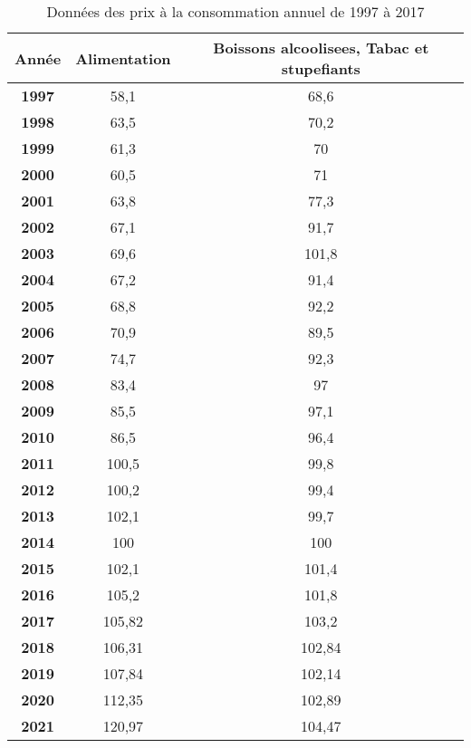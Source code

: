 \begin{table}[htbp]
	\centering
	\begin{tabular}{c|c|c}
		\hline
		\multicolumn{1}{p{3cm}}{\centering \textbf{Année}} & \multicolumn{1}{p{3cm}}{\centering Alimentation} & \multicolumn{1}{p{4cm}}{Boissons alcoolisees, Tabac et stupefiants} \\
		\hline \hline
		\textbf{1997} & 58,1   & 68,6 \\
		\textbf{1998} & 63,5   & 70,2 \\
		\textbf{1999} & 61,3   & 70 \\
		\textbf{2000} & 60,5   & 71 \\
		\textbf{2001} & 63,8   & 77,3 \\
		\textbf{2002} & 67,1   & 91,7 \\
		\textbf{2003} & 69,6   & 101,8 \\
		\textbf{2004} & 67,2   & 91,4 \\
		\textbf{2005} & 68,8   & 92,2 \\
		\textbf{2006} & 70,9   & 89,5 \\
		\textbf{2007} & 74,7   & 92,3 \\
		\textbf{2008} & 83,4   & 97 \\
		\textbf{2009} & 85,5   & 97,1 \\
		\textbf{2010} & 86,5   & 96,4 \\
		\textbf{2011} & 100,5  & 99,8 \\
		\textbf{2012} & 100,2  & 99,4 \\
		\textbf{2013} & 102,1  & 99,7 \\
		\textbf{2014} & 100    & 100 \\
		\textbf{2015} & 102,1  & 101,4 \\
		\textbf{2016} & 105,2  & 101,8 \\
		\textbf{2017} & 105,82 & 103,2 \\
		\textbf{2018} & 106,31 & 102,84 \\
		\textbf{2019} & 107,84 & 102,14 \\
		\textbf{2020} & 112,35 & 102,89 \\
		\textbf{2021} & 120,97 & 104,47 \\
	\end{tabular}%
	\caption{Données des prix à la consommation annuel de 1997 à 2017}
	\label{tab:addlabel}%
\end{table}%